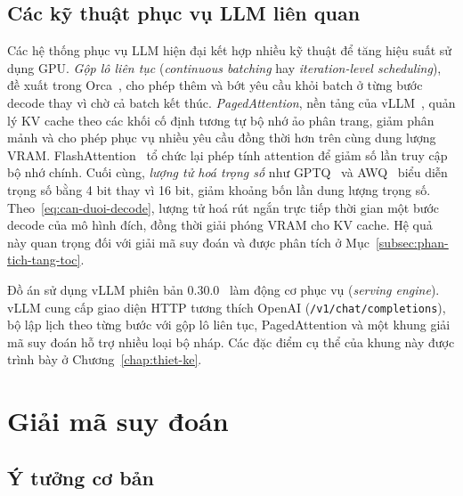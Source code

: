 \subsection{Các kỹ thuật phục vụ LLM liên quan}

Các hệ thống phục vụ LLM hiện đại kết hợp nhiều kỹ thuật để tăng hiệu suất sử dụng GPU. \textit{Gộp lô liên tục} (\textit{continuous batching} hay \textit{iteration-level scheduling}), đề xuất trong Orca~\cite{yu2022orca}, cho phép thêm và bớt yêu cầu khỏi batch ở từng bước decode thay vì chờ cả batch kết thúc. \textit{PagedAttention}, nền tảng của vLLM~\cite{kwon2023vllm}, quản lý KV cache theo các khối cố định tương tự bộ nhớ ảo phân trang, giảm phân mảnh và cho phép phục vụ nhiều yêu cầu đồng thời hơn trên cùng dung lượng VRAM. FlashAttention~\cite{dao2022flashattention} tổ chức lại phép tính attention để giảm số lần truy cập bộ nhớ chính. Cuối cùng, \textit{lượng tử hoá trọng số} như GPTQ~\cite{frantar2023gptq} và AWQ~\cite{lin2024awq} biểu diễn trọng số bằng 4 bit thay vì 16 bit, giảm khoảng bốn lần dung lượng trọng số. Theo~\eqref{eq:can-duoi-decode}, lượng tử hoá rút ngắn trực tiếp thời gian một bước decode của mô hình đích, đồng thời giải phóng VRAM cho KV cache. Hệ quả này quan trọng đối với giải mã suy đoán và được phân tích ở Mục~\ref{subsec:phan-tich-tang-toc}.

Đồ án sử dụng vLLM phiên bản 0.30.0~\cite{vllm-repo} làm động cơ phục vụ (\textit{serving engine}). vLLM cung cấp giao diện HTTP tương thích OpenAI (\texttt{/v1/chat/completions}), bộ lập lịch theo từng bước với gộp lô liên tục, PagedAttention và một khung giải mã suy đoán hỗ trợ nhiều loại bộ nháp. Các đặc điểm cụ thể của khung này được trình bày ở Chương~\ref{chap:thiet-ke}.

\section{Giải mã suy đoán}
\label{sec:giai-ma-suy-doan}

\subsection{Ý tưởng cơ bản}

